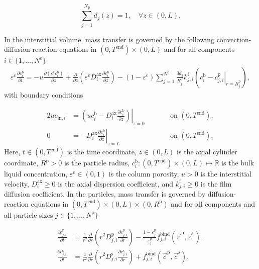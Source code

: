 \documentclass{article}
\begin{document}
    \begin{equation*}
	    \sum_{j=1}^{N_{\mathrm{p}}} d_j(z) = 1 , \quad \forall z \in (0, L).
    \end{equation*}

    
In the interstitial volume, mass transfer is governed by the following convection-diffusion-reaction equations in $(0, T^\mathrm{end})\times (0, L)$ and for all components $i\in\{1, \dots, N^{\mathrm{c}} \}$
\begin{align}
\varepsilon^{\mathrm{c}} \frac{\partial c^{\mathrm{b}}_i}{\partial t} = - u \frac{\partial \left( \varepsilon^{\mathrm{c}} c^{\mathrm{b}}_i \right)}{\partial z} + \frac{\partial}{\partial z} \left( \varepsilon^{\mathrm{c}} D^{\mathrm{ax}}_{i} \frac{\partial c^{\mathrm{b}}_i}{\partial z} \right)- \left(1 - \varepsilon^{\mathrm{c}} \right) \sum_{j=1}^{N^{\mathrm{p}}} \frac{3d_j}{R^{\mathrm{p}}_{j}} k^{\mathrm{f}}_{j,i} \left(c^{\mathrm{b}}_i - \left. c^{\mathrm{p}}_{j,i} \right|_{r = R^{\mathrm{p}}_{j}} \right),
\end{align}
with boundary conditions

\begin{alignat}{2}
u c_{\mathrm{in},i} &= \left.\left( u c^{\mathrm{b}}_i - D^{\mathrm{ax}}_{i} \frac{\partial c^{\mathrm{b}}_i}{\partial z}\right)\right|_{z=0} & &\qquad\text{on }(0, T^{\mathrm{end}}),\\
               0 &= - D^{\mathrm{ax}}_{i} \left. \frac{\partial c^{\mathrm{b}}_i}{\partial z} \right|_{z=L} & &\qquad\text{on }(0, T^{\mathrm{end}}).
\end{alignat}
Here, $t\in (0, T^{\mathrm{end}})$ is the time coordinate, $z\in (0, L)$ is the axial cylinder coordinate, $R^\mathrm{p}> 0$ is the particle radius, $c^{\mathrm{b}}_i\colon (0, T^\mathrm{end})\times (0, L) \mapsto \mathbb{R}$ is the bulk liquid concentration, $\varepsilon^{\mathrm{c}}\in (0, 1)$ is the column porosity, $u> 0$ is the interstitial velocity, $D^\mathrm{ax}_i\geq 0$ is the axial dispersion coefficient, and $k^\mathrm{f}_{j,i}\geq 0$ is the film diffusion coefficient.
In the particles, mass transfer is governed by diffusion-reaction equations in $(0, T^\mathrm{end}) \times (0, L)\times (0, R^{\mathrm{p}})$ and for all components and all particle sizes $j\in\{1, \dots, N^{\mathrm{p}}\}$

\begin{align}
\frac{\partial c^{\mathrm{p}}_{j,i}}{\partial t} &= \frac{1}{r^2} \frac{\partial }{\partial r} \left( r^2 D_{j,i}^{\mathrm{p}} \frac{\partial c^{\mathrm{p}}_{j,i}}{\partial r} \right) - \frac{1 - \varepsilon^{\mathrm{p}}_{j}}{\varepsilon^{\mathrm{p}}_{j}}f^{\mathrm{bind}}_{j,i}\left( \vec{c}^{\mathrm{p}}, \vec{c}^{\mathrm{s}} \right), \\
\frac{\partial c^{\mathrm{s}}_{j,i}}{\partial t} &=  \frac{1}{r^2} \frac{\partial }{\partial r} \left( r^2 D_{j,i}^{\mathrm{s}} \frac{\partial c^{\mathrm{s}}_{j,i}}{\partial r} \right)  + f^{\mathrm{bind}}_{j,i}\left( \vec{c}^{\mathrm{p}}, \vec{c}^{\mathrm{s}} \right),
\end{align}
\end{document}
